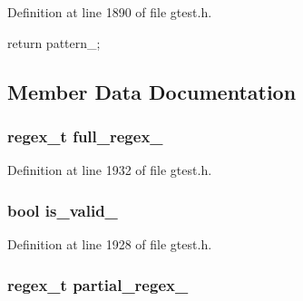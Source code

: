 \-Definition at line 1890 of file gtest.\-h.


\begin{DoxyCode}
{ return pattern_; }
\end{DoxyCode}


\subsection{\-Member \-Data \-Documentation}
\hypertarget{classtesting_1_1internal_1_1RE_a22941592dd4f6d88a4c8564e5aff436d}{
\subsubsection[{full\-\_\-regex\-\_\-}]{\setlength{\rightskip}{0pt plus 5cm}regex\-\_\-t {\bf full\-\_\-regex\-\_\-}}}\label{d0/d6d/classtesting_1_1internal_1_1RE_a22941592dd4f6d88a4c8564e5aff436d}


\-Definition at line 1932 of file gtest.\-h.

\hypertarget{classtesting_1_1internal_1_1RE_ae7854d62fc7885f59e963a27fceafaef}{
\subsubsection[{is\-\_\-valid\-\_\-}]{\setlength{\rightskip}{0pt plus 5cm}bool {\bf is\-\_\-valid\-\_\-}}}\label{d0/d6d/classtesting_1_1internal_1_1RE_ae7854d62fc7885f59e963a27fceafaef}


\-Definition at line 1928 of file gtest.\-h.

\hypertarget{classtesting_1_1internal_1_1RE_ac4bb10254cdba49a504ccf1541667d4d}{
\subsubsection[{partial\-\_\-regex\-\_\-}]{\setlength{\rightskip}{0pt plus 5cm}regex\-\_\-t {\bf partial\-\_\-regex\-\_\-}}}\label{d0/d6d/classtesting_1_1internal_1_1RE_ac4bb10254cdba49a504ccf1541667d4d}



